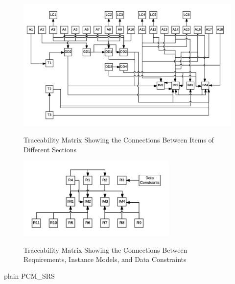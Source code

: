 \documentclass[12pt]{article}
\begin{document}
\begin{figure}[h!]
	\begin{center}
		{
			\includegraphics[width=\textwidth]{ATrace.png}
		}
		\caption{\label{Fig_ATrace} Traceability Matrix Showing the Connections Between Items of Different Sections}
	\end{center}
\end{figure}


\begin{figure}[h!]
	\begin{center}
		{
			\includegraphics[width=0.7\textwidth]{RTrace.png}
		}
		\caption{\label{Fig_RTrace} Traceability Matrix Showing the Connections Between Requirements, Instance Models, and Data Constraints}
	\end{center}
\end{figure}

\newpage

 {plain}
 {PCM_SRS}
\end{document}
